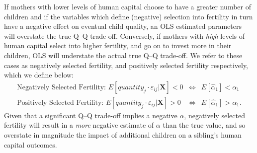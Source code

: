 \documentclass[subeqn]{article}
\begin{document}
\begin{spacing}{1.4}

If mothers with lower levels of human capital choose to have a greater number of
children and if the variables which define (negative) selection into fertility in turn
have a negative effect on eventual child quality, an OLS estimated parameters will
overstate the true Q--Q trade-off.  Conversely, if mothers with \emph{high} levels
of human capital select into higher fertility, and go on to invest more in their
children, OLS will understate the actual true Q--Q trade-off.  We refer to these
cases as negatively selected fertility, and positively selected fertility respectively,
which we define below:
\begin{eqnarray}
  \text{Negatively Selected Fertility:\ \ \ } E[quantity_{j}\cdot\varepsilon_{ij}|\bm{X}] < 0 &\Leftrightarrow& E[\hat\alpha_1] < \alpha_1 \nonumber \\
  \text{Positively Selected Fertility:\ \ \ }  E[quantity_{j}\cdot\varepsilon_{ij}|\bm{X}] > 0 &\Leftrightarrow& E[\hat\alpha_1] > \alpha_1. \nonumber
\end{eqnarray}
Given that a significant Q--Q trade-off implies a negative $\alpha$, negatively
selected fertility will result in a \emph{more} negative estimate of $\alpha$
than the true value, and so overstate in magnitude the impact of additional children
on a sibling's human capital outcomes.


\end{spacing}
\end{document}

